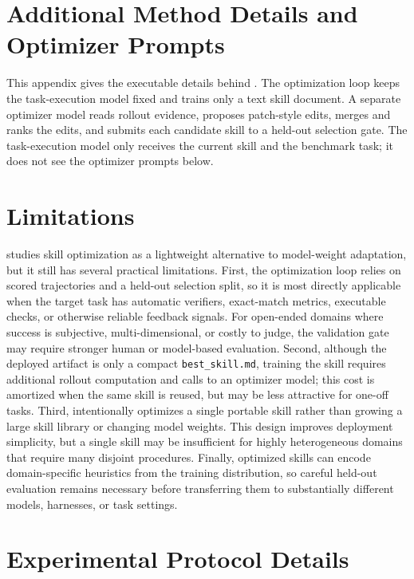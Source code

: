 \section{Additional Method Details and Optimizer Prompts}
\label{app:method_prompts}

This appendix gives the executable details behind \ourmethod{}. The optimization loop keeps the task-execution model fixed and trains only a text skill document. A separate optimizer model reads rollout evidence, proposes patch-style edits, merges and ranks the edits, and submits each candidate skill to a held-out selection gate. The task-execution model only receives the current skill and the benchmark task; it does not see the optimizer prompts below.

\section{Limitations}

\ourmethod{} studies skill optimization as a lightweight alternative to model-weight adaptation, but it still has several practical limitations. First, the optimization loop relies on scored trajectories and a held-out selection split, so it is most directly applicable when the target task has automatic verifiers, exact-match metrics, executable checks, or otherwise reliable feedback signals. For open-ended domains where success is subjective, multi-dimensional, or costly to judge, the validation gate may require stronger human or model-based evaluation. Second, although the deployed artifact is only a compact \texttt{best\_skill.md}, training the skill requires additional rollout computation and calls to an optimizer model; this cost is amortized when the same skill is reused, but may be less attractive for one-off tasks. Third, \ourmethod{} intentionally optimizes a single portable skill rather than growing a large skill library or changing model weights. This design improves deployment simplicity, but a single skill may be insufficient for highly heterogeneous domains that require many disjoint procedures. Finally, optimized skills can encode domain-specific heuristics from the training distribution, so careful held-out evaluation remains necessary before transferring them to substantially different models, harnesses, or task settings.

\section{Experimental Protocol Details}
\label{app:experimental_setting}

